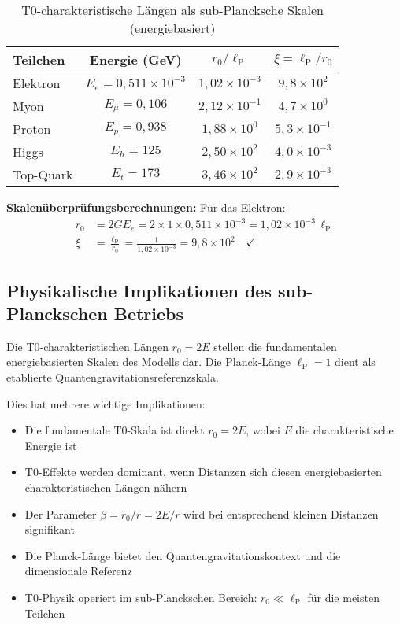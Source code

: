 \documentclass[12pt,a4paper]{report}
\newcommand{\lP}{\ell_{\text{P}}}         %
\newcommand{\rzero}{r_0}                  %
\begin{document}
	\begin{table}[htbp]
		\centering
		\begin{tabular}{lccc}
			\toprule
			\textbf{Teilchen} & \textbf{Energie (GeV)} & \textbf{$\rzero/\lP$} & \textbf{$\xi = \lP/\rzero$} \\
			\midrule
			Elektron & $E_e = 0,511 \times 10^{-3}$ & $1,02 \times 10^{-3}$ & $9,8 \times 10^{2}$ \\
			Myon & $E_\mu = 0,106$ & $2,12 \times 10^{-1}$ & $4,7 \times 10^{0}$ \\
			Proton & $E_p = 0,938$ & $1,88 \times 10^{0}$ & $5,3 \times 10^{-1}$ \\
			Higgs & $E_h = 125$ & $2,50 \times 10^{2}$ & $4,0 \times 10^{-3}$ \\
			Top-Quark & $E_t = 173$ & $3,46 \times 10^{2}$ & $2,9 \times 10^{-3}$ \\
			\bottomrule
		\end{tabular}
		\caption{T0-charakteristische Längen als sub-Plancksche Skalen (energiebasiert)}
		\label{tab:sub_planckian_scales}
	\end{table}
	
	\textbf{Skalenüberprüfungsberechnungen:}
	Für das Elektron:
	\begin{align}
		\rzero &= 2GE_e = 2 \times 1 \times 0,511 \times 10^{-3} = 1,02 \times 10^{-3} \, \lP \\
		\xi &= \frac{\lP}{\rzero} = \frac{1}{1,02 \times 10^{-3}} = 9,8 \times 10^{2} \quad \checkmark
	\end{align}
	
	\subsection{Physikalische Implikationen des sub-Planckschen Betriebs}
	\label{subsec:sub_planckian_implications}
	
	Die T0-charakteristischen Längen $\rzero = 2E$ stellen die fundamentalen energiebasierten Skalen des Modells dar. Die Planck-Länge $\lP = 1$ dient als etablierte Quantengravitationsreferenzskala.
	
	Dies hat mehrere wichtige Implikationen:
	\begin{itemize}
		\item Die fundamentale T0-Skala ist direkt $\rzero = 2E$, wobei $E$ die charakteristische Energie ist
		\item T0-Effekte werden dominant, wenn Distanzen sich diesen energiebasierten charakteristischen Längen nähern
		\item Der Parameter $\beta = \rzero/r = 2E/r$ wird bei entsprechend kleinen Distanzen signifikant
		\item Die Planck-Länge bietet den Quantengravitationskontext und die dimensionale Referenz
		\item T0-Physik operiert im sub-Planckschen Bereich: $\rzero \ll \lP$ für die meisten Teilchen
	\end{itemize}
	
\end{document}
